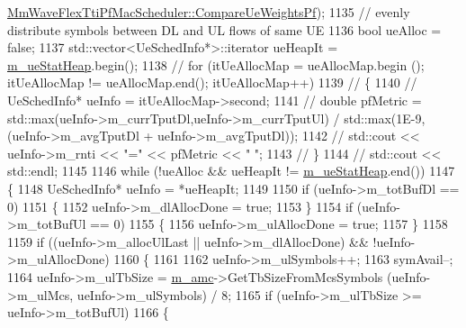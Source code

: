 \begin{DoxyCode}
      \hyperlink{classns3_1_1MmWaveFlexTtiPfMacScheduler_a6dfff91235926b82f832a910f6962d95}{MmWaveFlexTtiPfMacScheduler::CompareUeWeightsPf});
1135                 \textcolor{comment}{// evenly distribute symbols between DL and UL flows of same UE}
1136                 \textcolor{keywordtype}{bool} ueAlloc = \textcolor{keyword}{false};
1137                 std::vector<UeSchedInfo*>::iterator ueHeapIt = \hyperlink{classns3_1_1MmWaveFlexTtiPfMacScheduler_afa463c768b5a2c1447cdf48daa3cf412}{m\_ueStatHeap}.begin();
1138 \textcolor{comment}{//              for (itUeAllocMap = ueAllocMap.begin (); itUeAllocMap != ueAllocMap.end(); itUeAllocMap++)}
1139 \textcolor{comment}{//              \{}
1140 \textcolor{comment}{//                      UeSchedInfo* ueInfo = itUeAllocMap->second;}
1141 \textcolor{comment}{//                      double pfMetric = std::max(ueInfo->m\_currTputDl,ueInfo->m\_currTputUl) /
       std::max(1E-9,(ueInfo->m\_avgTputDl + ueInfo->m\_avgTputDl));}
1142 \textcolor{comment}{//                      std::cout << ueInfo->m\_rnti << "=" << pfMetric << " ";}
1143 \textcolor{comment}{//              \}}
1144 \textcolor{comment}{//              std::cout << std::endl;}
1145 
1146                 \textcolor{keywordflow}{while} (!ueAlloc && ueHeapIt != \hyperlink{classns3_1_1MmWaveFlexTtiPfMacScheduler_afa463c768b5a2c1447cdf48daa3cf412}{m\_ueStatHeap}.end())
1147                 \{
1148                         UeSchedInfo* ueInfo = *ueHeapIt;
1149 
1150                         \textcolor{keywordflow}{if} (ueInfo->m\_totBufDl == 0)
1151                         \{
1152                                 ueInfo->m\_dlAllocDone = \textcolor{keyword}{true};
1153                         \}
1154                         \textcolor{keywordflow}{if} (ueInfo->m\_totBufUl == 0)
1155                         \{
1156                                 ueInfo->m\_ulAllocDone = \textcolor{keyword}{true};
1157                         \}
1158 
1159                         \textcolor{keywordflow}{if} ((ueInfo->m\_allocUlLast || ueInfo->m\_dlAllocDone) && !ueInfo->m\_ulAllocDone)
1160                         \{
1161 
1162                                 ueInfo->m\_ulSymbols++;
1163                                 symAvail--;
1164                                 ueInfo->m\_ulTbSize = \hyperlink{classns3_1_1MmWaveFlexTtiPfMacScheduler_ab9cf29146f4e3094526de08ffe08b193}{m\_amc}->GetTbSizeFromMcsSymbols (ueInfo->m\_ulMcs, 
      ueInfo->m\_ulSymbols) / 8;
1165                                 \textcolor{keywordflow}{if} (ueInfo->m\_ulTbSize >= ueInfo->m\_totBufUl)
1166                                 \{

\end{DoxyCode}
